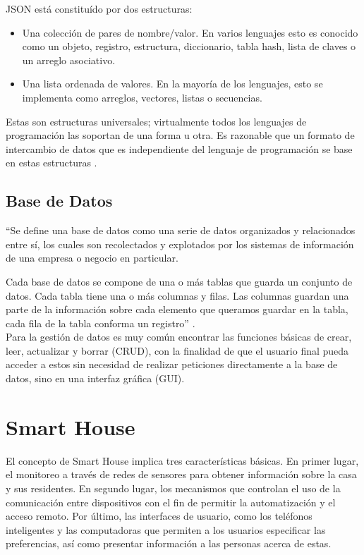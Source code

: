 JSON está constituído por dos estructuras:

\begin{itemize}
	\item Una colección de pares de nombre/valor. En varios lenguajes esto es conocido como un objeto, registro, estructura, diccionario, tabla hash, lista de claves o un arreglo asociativo.
	
	\item Una lista ordenada de valores. En la mayoría de los lenguajes, esto se implementa como arreglos, vectores, listas o secuencias.
\end{itemize}

Estas son estructuras universales; virtualmente todos los lenguajes de programación las soportan de una forma u otra. Es razonable que un formato de intercambio de datos que es independiente del lenguaje de programación se base en estas estructuras \cite{JSON}.

\subsection{Base de Datos}

``Se define una base de datos como una serie de datos organizados y relacionados entre sí, los cuales son recolectados y explotados por los sistemas de información de una empresa o negocio en particular.

Cada base de datos se compone de una o más tablas que guarda un conjunto de datos. Cada tabla tiene una o más columnas y filas. Las columnas guardan una parte de la información sobre cada elemento que queramos guardar en la tabla, cada fila de la tabla conforma un registro'' \cite{DB}. \\

Para la gestión de datos es muy común encontrar las funciones básicas de crear, leer, actualizar y borrar (CRUD), con la finalidad de que el usuario final pueda acceder a estos sin necesidad de realizar peticiones directamente a la base de datos, sino en una interfaz gráfica (GUI).

\section{Smart House}

El concepto de Smart House implica tres características básicas. En primer lugar, el monitoreo a través de redes de sensores para obtener información sobre la casa y sus residentes. En segundo lugar, los mecanismos que controlan el uso de la comunicación entre dispositivos con el fin de permitir la automatización y el acceso remoto. Por último, las interfaces de usuario, como los teléfonos inteligentes y las computadoras que permiten a los usuarios especificar las preferencias, así como presentar información a las personas acerca de estas. \\

